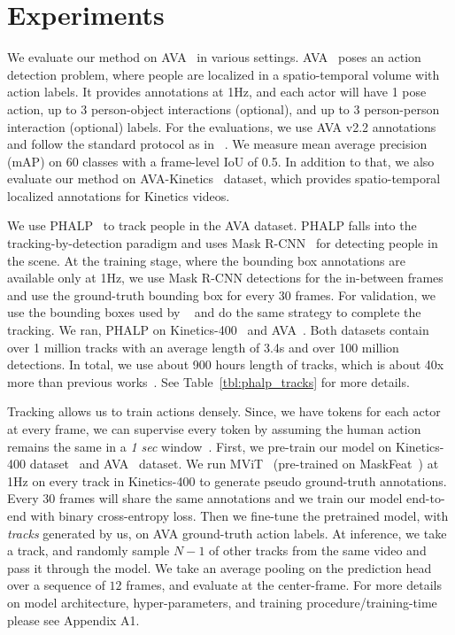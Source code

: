 \section{Experiments}
\label{sec:experiments}

We evaluate our method on AVA~\cite{gu2018ava} in various settings. AVA~\cite{gu2018ava} poses an action detection problem, where people are localized in a spatio-temporal volume with action labels. It provides annotations at 1Hz, and each actor will have 1 pose action, up to 3 person-object interactions (optional), and up to 3 person-person interaction (optional) labels. For the evaluations, we use AVA v2.2 annotations and follow the standard protocol as in ~\cite{gu2018ava}. We measure mean average precision (mAP) on 60 classes with a frame-level IoU of 0.5. In addition to that, we also evaluate our method on AVA-Kinetics~\cite{li2020ava} dataset, which provides spatio-temporal localized annotations for Kinetics videos.

We use PHALP~\cite{rajasegaran2022tracking} to track people in the AVA dataset. PHALP falls into the tracking-by-detection paradigm and uses Mask R-CNN~\cite{he2017mask} for detecting people in the scene. At the training stage, where the bounding box annotations are available only at 1Hz, we use Mask R-CNN detections for the in-between frames and use the ground-truth bounding box for every 30 frames. For validation, we use the bounding boxes used by ~\cite{pan2021actor} and do the same strategy to complete the tracking. We ran, PHALP on Kinetics-400~\cite{kay2017kinetics} and AVA~\cite{gu2018ava}. Both datasets contain over 1 million tracks with an average length of 3.4s and over 100 million detections. In total, we use about 900 hours length of tracks, which is about 40x more than previous works~\cite{kanazawa2019learning}. See Table~\ref{tbl:phalp_tracks} for more details. 

Tracking allows us to train actions densely. Since, we have tokens for each actor at every frame, we can supervise every token by assuming the human action remains the same in a \textit{1 sec} window~\cite{gu2018ava}. First, we pre-train our model on Kinetics-400 dataset~\cite{kay2017kinetics} and AVA~\cite{gu2018ava} dataset. We run MViT~\cite{fan2021multiscale} (pre-trained on MaskFeat~\cite{wei2022masked}) at 1Hz on every track in Kinetics-400 to generate pseudo ground-truth annotations. Every 30 frames will share the same annotations and we train our model end-to-end with binary cross-entropy loss. Then we fine-tune the pretrained model, with \textit{tracks} generated by us, on AVA ground-truth action labels. At inference, we take a track, and randomly sample $N-1$ of other tracks from the same video and pass it through the model. We take an average pooling on the prediction head over a sequence of $12$ frames, and evaluate at the center-frame. For more details on model architecture, hyper-parameters, and training procedure/training-time please see Appendix A1.

